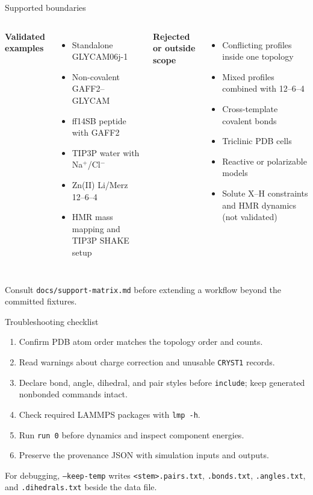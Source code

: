 \documentclass[aspectratio=169,11pt]{beamer}
\begin{document}
\begin{frame}{Supported boundaries}
\begin{columns}[T,onlytextwidth]
{\color{Success}\textbf{Validated examples}}
\begin{itemize}
  \item Standalone GLYCAM06j-1
  \item Non-covalent GAFF2--GLYCAM
  \item ff14SB peptide with GAFF2
  \item TIP3P water with Na$^+$/Cl$^-$
  \item Zn(II) Li/Merz 12--6--4
  \item HMR mass mapping and TIP3P SHAKE setup
\end{itemize}
{\color{Danger}\textbf{Rejected or outside scope}}
\begin{itemize}
  \item Conflicting profiles inside one topology
  \item Mixed profiles combined with 12--6--4
  \item Cross-template covalent bonds
  \item Triclinic PDB cells
  \item Reactive or polarizable models
  \item Solute X--H constraints and HMR dynamics (not validated)
\end{itemize}
\end{columns}
\vspace{0.3cm}

Consult \texttt{docs/support-matrix.md} before extending a workflow beyond the committed fixtures.
\end{frame}

\begin{frame}{Troubleshooting checklist}
\begin{enumerate}
  \item Confirm PDB atom order matches the topology order and counts.
  \item Read warnings about charge correction and unusable \texttt{CRYST1} records.
  \item Declare bond, angle, dihedral, and pair styles before \texttt{include}; keep generated nonbonded commands intact.
  \item Check required LAMMPS packages with \texttt{lmp -h}.
  \item Run \texttt{run 0} before dynamics and inspect component energies.
  \item Preserve the provenance JSON with simulation inputs and outputs.
\end{enumerate}
\vspace{0.3cm}

For debugging, \texttt{--keep-temp} writes \texttt{<stem>.pairs.txt}, \texttt{.bonds.txt}, \texttt{.angles.txt}, and \texttt{.dihedrals.txt} beside the data file.
\end{frame}
\end{document}
